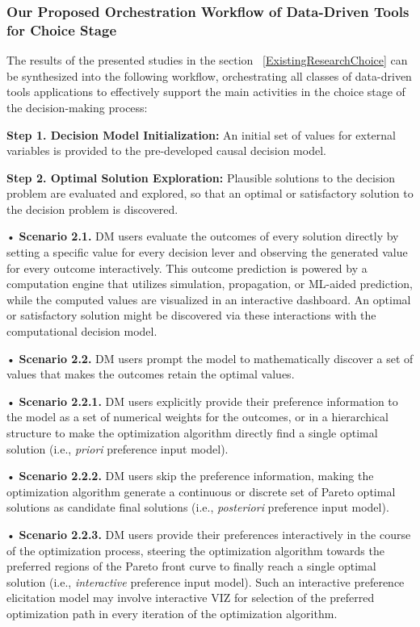 \documentclass{sfuthesis}
\begin{document}
\subsubsection{Our Proposed Orchestration Workflow of Data-Driven Tools for Choice Stage}
The results of the presented studies in the section ~\ref{ExistingResearchChoice} can be synthesized into the following workflow, orchestrating all classes of data-driven tools applications to effectively support the main activities in the choice stage of the decision-making process:\par
\textbf{Step 1. Decision Model Initialization:} An initial set of values for external variables is provided to the pre-developed causal decision model.\par
\textbf{Step 2. Optimal Solution Exploration:} Plausible solutions to the decision problem are evaluated and explored, so that an optimal or satisfactory solution to the decision problem is discovered.\par
{
\setlength{\leftskip}{0.5cm}
\noindent•	\textbf{Scenario 2.1.} DM users evaluate the outcomes of every solution directly by setting a specific value for every decision lever and observing the generated value for every outcome interactively. This outcome prediction is powered by a computation engine that utilizes simulation, propagation, or ML-aided prediction, while the computed values are visualized in an interactive dashboard. An optimal or satisfactory solution might be discovered via these interactions with the computational decision model.\par
\noindent•	\textbf{Scenario 2.2.} DM users prompt the model to mathematically discover a set of values that makes the outcomes retain the optimal values.\par
}
{
\setlength{\leftskip}{1cm}
\noindent•	\textbf{Scenario 2.2.1.} DM users explicitly provide their preference information to the model as a set of numerical weights for the outcomes, or in a hierarchical structure to make the optimization algorithm directly find a single optimal solution (i.e., \textit{priori} preference input model).\par
\noindent•	\textbf{Scenario 2.2.2.} DM users skip the preference information, making the optimization algorithm generate a continuous or discrete set of Pareto optimal solutions as candidate final solutions (i.e., \textit{posteriori} preference input model).\par
\noindent•	\textbf{Scenario 2.2.3.} DM users provide their preferences interactively in the course of the optimization process, steering the optimization algorithm towards the preferred regions of the Pareto front curve to finally reach a single optimal solution (i.e., \textit{interactive} preference input model). Such an interactive preference elicitation model may involve interactive VIZ for selection of the preferred optimization path in every iteration of the optimization algorithm.\par
}
\end{document}
